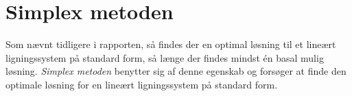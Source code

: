 \chapter{Simplex metoden}
\label{coronaaaaaaaaaaa}
Som nævnt tidligere i rapporten, så findes der en optimal løsning til et lineært ligningssystem på standard form, så længe der findes mindst én basal mulig løsning. 
\textit{Simplex metoden} benytter sig af denne egenskab og forsøger at finde den optimale løsning for en lineært ligningssystem på standard form.
%
%
%
%
%
%
%
%
%
